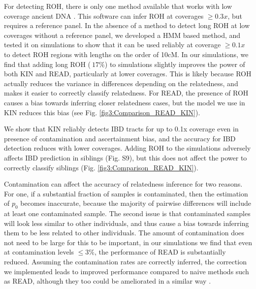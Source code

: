 \documentclass[12pt, letterpaper]{article}
\begin{document}
For detecting ROH, there is only one method available that works with low coverage ancient DNA \cite{ringbauer_parental_2021}. This software can infer ROH at coverages $\geq0.3x$, but requires a reference panel. In the absence of a method to detect long ROH at low coverages without a reference panel, we developed a HMM based method, and tested it on simulations to show that it can be used reliably at coverage $\geq 0.1x$ to detect ROH regions with lengths on the order of 10cM. 
In our simulations, we find that adding long ROH ($~17\%$) to simulations slightly improves the power of both KIN and READ, particularly at lower coverages. This is likely because ROH actually reduces the variance in differences depending on the relatedness, and makes it easier to correctly classify relatedness. For READ, the presence of ROH causes a bias towards inferring closer relatedness cases, but the model we use in KIN reduces this bias (see Fig. \ref{fig3:Comparison_READ_KIN}). 

We show that KIN reliably detects IBD tracts for up to 0.1x coverage even in presence of contamination and ascertainment bias, and the accuracy for IBD detection reduces with lower coverages. Adding ROH to the simulations adversely affects IBD prediction in siblings (Fig. S9), but this does not affect the power to correctly classify siblings (Fig. \ref{fig3:Comparison_READ_KIN}).

Contamination can affect the accuracy of relatedness inference for two reasons. For one, if a substantial fraction of samples is contaminated, then the estimation of $p_0$ becomes inaccurate, because the majority of pairwise differences will include at least one contaminated sample. The second issue is that contaminated samples will look less similar to other individuals, and thus cause a bias towards inferring them to be less related to other individuals. The amount of contamination does not need to be large for this to be important, in our simulations we find that even at contamination levels $\leq 3\%$, the performance of READ is substantially reduced. Assuming the contamination rates are correctly inferred, the correction we implemented leads to improved performance compared to naive methods such as READ, although they too could be ameliorated in a similar way \cite{laurits_skov_genetic_nodate}.
\end{document}
